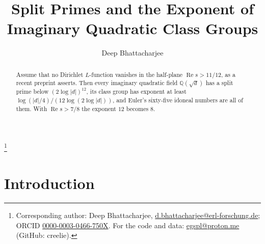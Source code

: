 \documentclass[11pt]{amsart}
\theoremstyle{definition}
\theoremstyle{remark}
\numberwithin{equation}{section}
\renewcommand{\Re}{\operatorname{Re}}
\newcommand{\Q}{\mathbb{Q}}
\begin{document}
\title{Split Primes and the Exponent of Imaginary Quadratic Class Groups}

\author{Deep Bhattacharjee}
\address{Formerly, Electro-Gravitational Space Propulsion Laboratory (EGSPL),\newline Bhubaneswar, Odisha 751030, India\newline
Formerly, University of Calcutta (Heramba Chandra College),/49 Gariahat Road, Golpark, Kolkata 700029, West Bengal, India}
\thanks{Corresponding author: Deep Bhattacharjee, \href{mailto:d.bhattacharjee@erl-forschung.de}{d.bhattacharjee@erl-forschung.de}; ORCID \href{https://orcid.org/0000-0003-0466-750X}{\mbox{0000-0003-0466-750X}}. For the code and data: \href{mailto:egspl@proton.me}{egspl@proton.me} (GitHub: creelie).}


\begin{abstract}
Assume that no Dirichlet $L$-function vanishes in the half-plane $\Re s>11/12$, as a recent preprint asserts. Then every imaginary quadratic field $\Q(\sqrt d)$ has a split prime below $(2\log|d|)^{12}$, its class group has exponent at least $\log(|d|/4)/(12\log(2\log|d|))$, and Euler's sixty-five idoneal numbers are all of them. With $\Re s>7/8$ the exponent $12$ becomes $8$.
\end{abstract}

\maketitle

\section{Introduction}\label{sec:intro}
\end{document}
